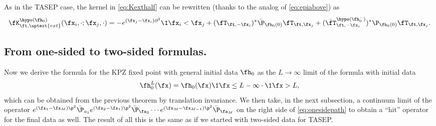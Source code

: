\documentclass[]{pcmi}
\theoremstyle{plain}
\theoremstyle{definition}
\begin{document}
As in the TASEP case, the kernel in \eqref{eq:Kexthalf} can be rewritten (thanks to the analog of \eqref{eq:epiabove}) as
\begin{equation}\label{eq:Kexthalf-alt}
    \fK^{\hypo(\fh_0)}_{\ft,\uptext{ext}}(\fx_i,\cdot;\fx_j,\cdot)=-e^{(\fx_j-\fx_i)\partial^2}\1{\fx_i<\fx_j}
    +(\fT_{\ft,-\fx_i})^*\bar \P_{\fh_0(0)}\fT_{\ft,\fx_j}+(\bar{\fT}^{\hypo(\fh_0^-)}_{\ft,-\fx_i})^* \P_{\fh_0(0)}\fT_{\ft,\fx_j}.
\end{equation}

\subsection{From one-sided to two-sided formulas.}

Now we derive the formula for the KPZ fixed point with general initial data $\fh_0$  
as the $L\to\infty$ limit of the formula with initial data \[\fh_0^L(\fx)=\fh_0(\fx)\1{\fx\leq L}-\infty\cdot\1{\fx>L},\] which can be obtained from the previous theorem by translation invariance. 
We then take, in the next subsection, a continuum limit of the operator $e^{(\fx_1-\fx_M)\p^2}\bar \P_{a_1}e^{(\fx_2-\fx_1)\p^2}\bar \P_{\fa_2}\dotsm e^{(\fx_M-\fx_{M-1})\p^2}\bar \P_{\fa_M}$ on the right side of \eqref{eq:onesidepath} to obtain a ``hit'' operator for the final data as well.  The result of all this is the same as if we started with two-sided data for TASEP.  
\end{document}
